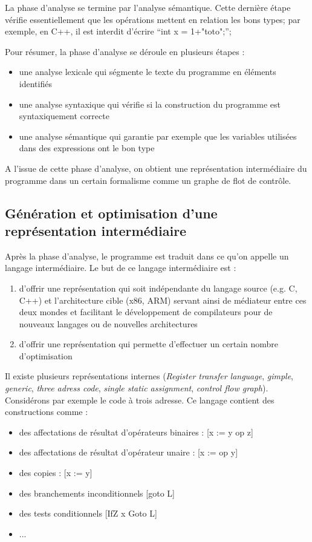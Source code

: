 La phase d'analyse se termine par l'analyse sémantique. Cette dernière étape vérifie essentiellement que les opérations mettent en relation les bons types; par exemple, en C++, il est interdit d'écrire ``int x = 1+"toto";'';



Pour résumer, la phase d'analyse se déroule en plusieurs étapes :
\begin{itemize}
\item une analyse lexicale qui ségmente le texte du programme en éléments identifiés
\item une analyse syntaxique qui vérifie si la construction du programme est syntaxiquement correcte
\item une analyse sémantique qui garantie par exemple que les variables utilisées dans des expressions ont le bon type
\end{itemize}
A l'issue de cette phase d'analyse, on obtient une représentation intermédiaire du programme dans un certain formalisme comme un graphe de flot de contrôle.

\subsection{Génération et optimisation d'une représentation intermédiaire}


Après la phase d'analyse, le programme est traduit dans ce qu'on appelle un langage intermédiaire. Le but de ce langage intermédiaire est :
\begin{enumerate}
\item d'offrir une représentation qui soit indépendante du langage source (e.g. C, C++) et l'architecture cible (x86, ARM) servant ainsi de médiateur entre ces deux mondes et facilitant le développement de compilateurs pour de nouveaux langages ou de nouvelles architectures
\item d'offrir une représentation qui permette d'effectuer un certain nombre d'optimisation
\end{enumerate}
Il existe plusieurs représentations internes (\emph{Register transfer language}, \emph{gimple}, \emph{generic}, \emph{three adress code}, \emph{single static assignment}, \emph{control flow graph}). Considérons par exemple le code à trois adresse. Ce langage contient des constructions comme :
\begin{itemize}
\item des affectations de résultat d'opérateurs binaires : [x := y op z]
\item des affectations de résultat d'opérateur unaire : [x := op y]
\item des copies : [x := y]
\item des branchements inconditionnels [goto L]
\item des tests conditionnels [IfZ x Goto L]
\item ...
\end{itemize}

